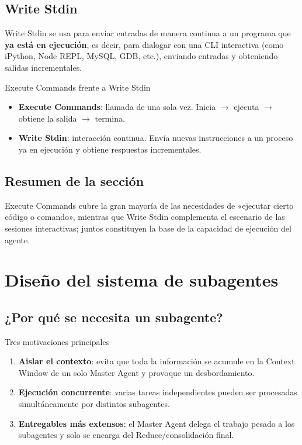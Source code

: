 \documentclass[a4paper]{article}
\begin{document}
\subsection{Write Stdin}

Write Stdin se usa para enviar entradas de manera continua a un programa que \textbf{ya está en ejecución}, es decir, para dialogar con una CLI interactiva (como iPython, Node REPL, MySQL, GDB, etc.), enviando entradas y obteniendo salidas incrementales.

\begin{importantbox}{Execute Commands frente a Write Stdin}
\begin{itemize}
    \item \textbf{Execute Commands}: llamada de una sola vez. Inicia $\rightarrow$ ejecuta $\rightarrow$ obtiene la salida $\rightarrow$ termina.
    \item \textbf{Write Stdin}: interacción continua. Envía nuevas instrucciones a un proceso ya en ejecución y obtiene respuestas incrementales.
\end{itemize}
\end{importantbox}

\subsection{Resumen de la sección}

Execute Commands cubre la gran mayoría de las necesidades de «ejecutar cierto código o comando», mientras que Write Stdin complementa el escenario de las sesiones interactivas; juntos constituyen la base de la capacidad de ejecución del agente.

\section{Diseño del sistema de subagentes}

\subsection{¿Por qué se necesita un subagente?}

\begin{importantbox}{Tres motivaciones principales}
\begin{enumerate}
    \item \textbf{Aislar el contexto}: evita que toda la información se acumule en la Context Window de un solo Master Agent y provoque un desbordamiento.
    \item \textbf{Ejecución concurrente}: varias tareas independientes pueden ser procesadas simultáneamente por distintos subagentes.
    \item \textbf{Entregables más extensos}: el Master Agent delega el trabajo pesado a los subagentes y solo se encarga del Reduce/consolidación final.
\end{enumerate}
\end{importantbox}
\end{document}
